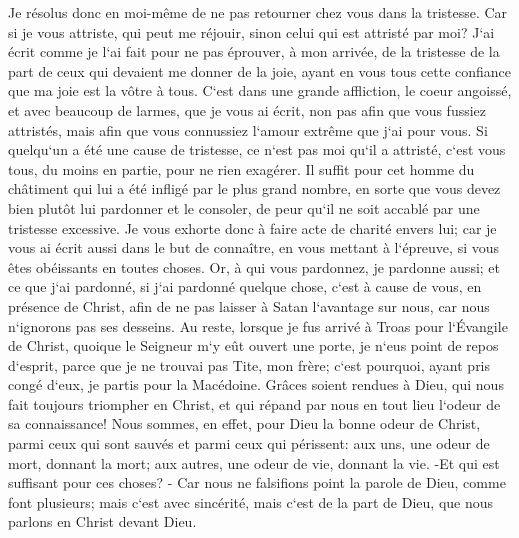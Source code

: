 \verse Je résolus donc en moi-même de ne pas retourner chez vous dans la tristesse. 
\verse Car si je vous attriste, qui peut me réjouir, sinon celui qui est attristé par moi? 
\verse J`ai écrit comme je l`ai fait pour ne pas éprouver, à mon arrivée, de la tristesse de la part de ceux qui devaient me donner de la joie, ayant en vous tous cette confiance que ma joie est la vôtre à tous. 
\verse C`est dans une grande affliction, le coeur angoissé, et avec beaucoup de larmes, que je vous ai écrit, non pas afin que vous fussiez attristés, mais afin que vous connussiez l`amour extrême que j`ai pour vous. 
\verse Si quelqu`un a été une cause de tristesse, ce n`est pas moi qu`il a attristé, c`est vous tous, du moins en partie, pour ne rien exagérer. 
\verse Il suffit pour cet homme du châtiment qui lui a été infligé par le plus grand nombre, 
\verse en sorte que vous devez bien plutôt lui pardonner et le consoler, de peur qu`il ne soit accablé par une tristesse excessive. 
\verse Je vous exhorte donc à faire acte de charité envers lui; 
\verse car je vous ai écrit aussi dans le but de connaître, en vous mettant à l`épreuve, si vous êtes obéissants en toutes choses. 
\verse Or, à qui vous pardonnez, je pardonne aussi; et ce que j`ai pardonné, si j`ai pardonné quelque chose, c`est à cause de vous, en présence de Christ, 
\verse afin de ne pas laisser à Satan l`avantage sur nous, car nous n`ignorons pas ses desseins. 
\verse Au reste, lorsque je fus arrivé à Troas pour l`Évangile de Christ, quoique le Seigneur m`y eût ouvert une porte, je n`eus point de repos d`esprit, parce que je ne trouvai pas Tite, mon frère; 
\verse c`est pourquoi, ayant pris congé d`eux, je partis pour la Macédoine. 
\verse Grâces soient rendues à Dieu, qui nous fait toujours triompher en Christ, et qui répand par nous en tout lieu l`odeur de sa connaissance! 
\verse Nous sommes, en effet, pour Dieu la bonne odeur de Christ, parmi ceux qui sont sauvés et parmi ceux qui périssent: 
\verse aux uns, une odeur de mort, donnant la mort; aux autres, une odeur de vie, donnant la vie. -Et qui est suffisant pour ces choses? - 
\verse Car nous ne falsifions point la parole de Dieu, comme font plusieurs; mais c`est avec sincérité, mais c`est de la part de Dieu, que nous parlons en Christ devant Dieu. 

\chapter{}

